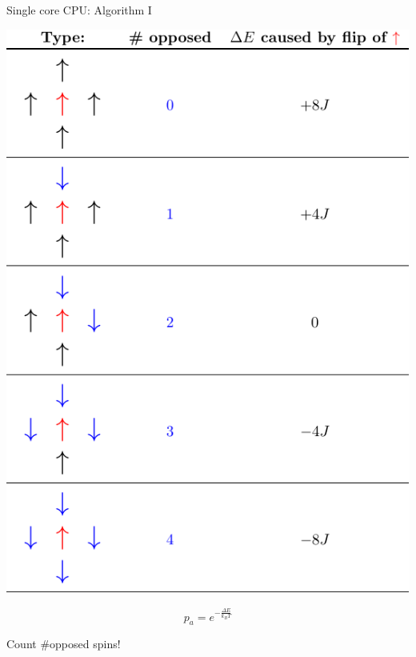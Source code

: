 \documentclass{beamer}
\begin{document}
\begin{frame}{Single core CPU: Algorithm I}
    \begin{minipage}{0.5\textwidth}
        \includegraphics[keepaspectratio=true, scale=0.6]{images/cases.pdf}\\
    \end{minipage} \pause
    \hfill
    \begin{minipage}{0.4\textwidth}
        \begin{equation*}
            p_a = e^{-\frac{\Delta E}{k_B T}}
        \end{equation*} \pause
        \begin{highlightbox}
            Count \#opposed spins!
        \end{highlightbox}
    \end{minipage}
\end{frame}
\end{document}
